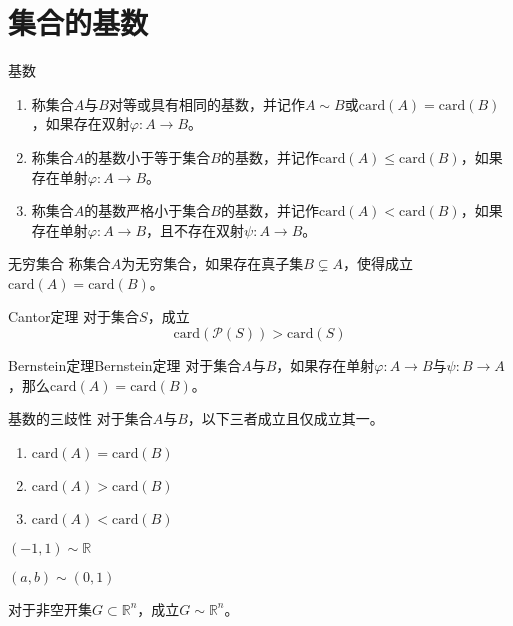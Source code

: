 \documentclass[lang = cn, scheme = chinese, thmcnt = section]{elegantbook}
\newcommand{\R}{\mathbb{R}}            %
\newcommand{\sub}{\subset}             %
\newcommand{\card}{\mathrm{card}}
\begin{document}
\section{集合的基数}

\begin{definition}{基数}
	\begin{enumerate}
		\item 称集合$A$与$B$对等或具有相同的基数，并记作$A\sim B$或$\card(A)=\card(B)$，如果存在双射$\varphi:A\to B$。
		\item 称集合$A$的基数小于等于集合$B$的基数，并记作$\card(A)\le \card(B)$，如果存在单射$\varphi:A\to B$。
		\item 称集合$A$的基数严格小于集合$B$的基数，并记作$\card(A)<\card(B)$，如果存在单射$\varphi:A\to B$，且不存在双射$\psi:A\to B$。
	\end{enumerate}
\end{definition}

\begin{definition}{无穷集合}
	称集合$A$为无穷集合，如果存在真子集$B\subsetneq A$，使得成立$\card(A)=\card(B)$。
\end{definition}

\begin{theorem}{Cantor定理}
	对于集合$S$，成立%
	$$
	\card(\mathscr{P}(S))>\card(S)
	$$
\end{theorem}

\begin{theorem}{Bernstein定理}{Bernstein定理}
	对于集合$A$与$B$，如果存在单射$\varphi:A\to B$与$\psi:B\to A$，那么$\card(A)=\card(B)$。
\end{theorem}

\begin{theorem}{基数的三歧性}
	对于集合$A$与$B$，以下三者成立且仅成立其一。
	\begin{enumerate}
		\item $\card(A)=\card(B)$
		\item $\card(A)>\card(B)$
		\item $\card(A)<\card(B)$
	\end{enumerate}
\end{theorem}

\begin{exercise}
	$(-1,1)\sim\R$
\end{exercise}

\begin{exercise}
	$(a,b)\sim(0,1)$
\end{exercise}

\begin{exercise}
	对于非空开集$G\sub\R^n$，成立$G\sim \R^n$。
\end{exercise}
\end{document}
